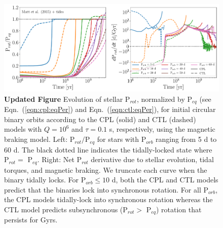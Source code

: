 \documentclass[twocolumn]{aastex61}
\newcommand{\xxx}[1]{{\textbf{#1}}}
\begin{document}
\begin{figure}
	\includegraphics[width=\textwidth]{../Plots/eqPerTwoPanelMatt.pdf}
   \caption{\xxx{Updated Figure} Evolution of stellar P$_{rot}$, normalized by P$_{eq}$ (see Eqn.~(\ref{eqn:cpl:eqPer}) and Eqn.~(\ref{eqn:ctl:eqPer}), for initial circular binary orbits according to the CPL (solid) and CTL (dashed) models with $Q = 10^6$ and $\tau = 0.1$ s, respectively, using the \citet{Matt2015} magnetic braking model. Left: P$_{rot}/$P$_{eq}$ for stars with P$_{orb}$ ranging from 5 d to 60 d. The black dotted line indicates the tidally-locked state where P$_{rot} = $ P$_{eq}$.  Right: Net P$_{rot}$ derivative due to stellar evolution, tidal torques, and magnetic braking.  We truncate each curve when the binary tidally locks. For P$_{orb} \leq 10$ d, both the CPL and CTL models predict that the binaries lock into synchronous rotation.  For all P$_{orb}$, the CPL models tidally-lock into synchronous rotation whereas the CTL model predicts subsynchronous (P$_{rot} > $ P$_{eq}$) rotation that persists for Gyrs.}%
    \label{fig:eqPer}%
\end{figure}

\end{document}
